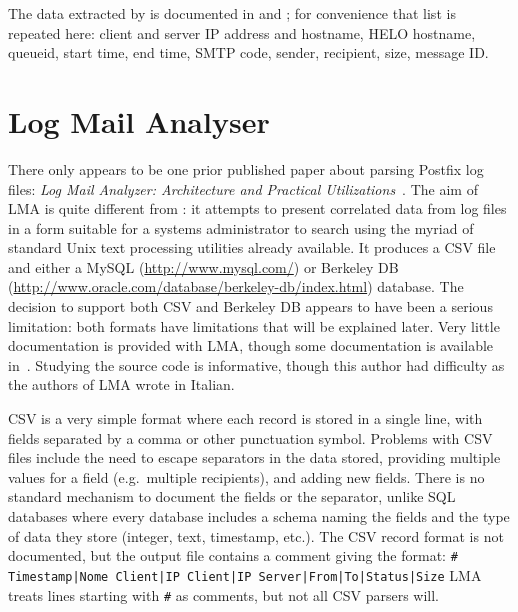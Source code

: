 The data extracted by \parsername{} is documented in
 and ; for
convenience that list is repeated here: client and server \gls{IP} address
and hostname, HELO hostname, queueid, start time, end time, \gls{SMTP}
code, sender, recipient, size, message ID\@.

\section{Log Mail Analyser}

\label{prior art}

There only appears to be one prior published paper about parsing Postfix
log files: \textit{Log Mail Analyzer: Architecture and Practical
Utilizations\/}~\cite{log-mail-analyser}.  The aim of \gls{LMA} is quite
different from \parsername{}: it attempts to present correlated data from
log files in a form suitable for a systems administrator to search using
the myriad of standard Unix text processing utilities already available.
It produces a \gls{CSV} file and either a MySQL
(\url{http://www.mysql.com/}) or Berkeley DB
(\url{http://www.oracle.com/database/berkeley-db/index.html}) database.
The decision to support both \gls{CSV} and Berkeley DB appears to have been
a serious limitation: both formats have limitations that will be explained
later.  Very little documentation is provided with \gls{LMA}, though some
documentation is available in~\cite{log-mail-analyser}.  Studying the
source code is informative, though this author had difficulty as the
authors of \gls{LMA} wrote in Italian.

\gls{CSV} is a very simple format where each record is stored in a single
line, with fields separated by a comma or other punctuation symbol.
Problems with \gls{CSV} files include the need to escape separators in the
data stored, providing multiple values for a field (e.g.\ multiple
recipients), and adding new fields.  There is no standard mechanism to
document the fields or the separator, unlike \gls{SQL} databases where
every database includes a schema naming the fields and the type of data
they store (integer, text, timestamp, etc.).  The \gls{CSV} record format
is not documented, but the output file contains a comment giving the
format:\newline{} \texttt{\# Timestamp|Nome Client|IP Client|IP
Server|From|To|Status|Size} \newline{}\gls{LMA} treats lines starting with
\texttt{\#} as comments, but not all \gls{CSV} parsers will.

